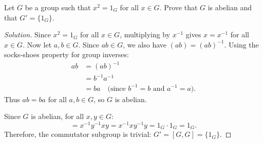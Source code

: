 \begin{problem}
Let $G$ be a group such that $x^2 = 1_G$ for all $x \in G$. Prove that $G$ is abelian and that $G' = \{1_G\}$.
\end{problem}

\begin{proof}[Solution]
Since $x^2 = 1_G$ for all $x \in G$, multiplying by $x^{-1}$ gives $x = x^{-1}$ for all $x \in G$.
Now let $a, b \in G$. Since $ab \in G$, we also have $(ab) = (ab)^{-1}$.
Using the socks-shoes property for group inverses:
\begin{align*}
ab &= (ab)^{-1} \\
&= b^{-1}a^{-1} \\
&= ba \quad \text{(since $b^{-1} = b$ and $a^{-1} = a$)}.
\end{align*}
Thus $ab = ba$ for all $a, b \in G$, so $G$ is abelian.

Since $G$ is abelian, for all $x, y \in G$:
\begin{equation*}
[x, y] = x^{-1}y^{-1}xy = x^{-1}x y^{-1}y = 1_G \cdot 1_G = 1_G.
\end{equation*}
Therefore, the commutator subgroup is trivial: $G' = [G, G] = \{1_G\}$.
\end{proof}
